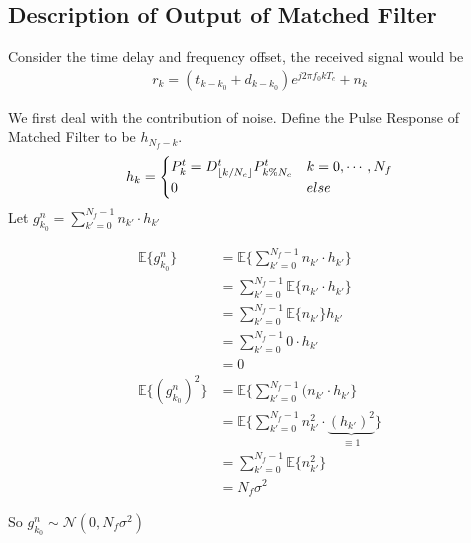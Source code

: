 \documentclass[a4paper]{article}
\begin{document}
\subsection{Description of Output of Matched Filter} %
\label{sub:description_of_output_of_matched_filter}
Consider the time delay and frequency offset, the received signal would be 
\begin{align}
	r_k = (t_{k - k_0} + d_{k - k_0}) e^{j 2\pi f_0 k T_c} + n_k
\end{align}

We first deal with the contribution of noise.
Define the Pulse Response of Matched Filter to be $h_{N_f-k}$.
\begin{align}
	h_k = 
	\begin{cases}
	P^t_{k} = D^t_{\lfloor k/N_c\rfloor}P^t_{k\%N_c} & k = 0, \cdots, N_f\\
	0 	& else	
	\end{cases}
\end{align}
Let $g^n_{k_0}= \sum_{k' = 0}^{N_f-1} n_{k'} \cdot h_{k'}$

\begin{align}
	\mathbb{E} \{ g^n_{k_0}\}
	&= \mathbb{E} \{\sum_{k' = 0}^{N_f-1} n_{k'} \cdot h_{k'}\} \\
	&= \sum_{k' = 0}^{N_f-1} \mathbb{E} \{ n_{k'} \cdot h_{k'} \} \\
	&= \sum_{k' = 0}^{N_f-1} \mathbb{E} \{ n_{k'}\} h_{k'} \\
	&= \sum_{k' = 0}^{N_f-1} 0 \cdot h_{k'} \\
	&= 0\\
	\mathbb{E} \{ (g^n_{k_0})^2\}
	&= \mathbb{E} \{\sum_{k' = 0}^{N_f-1} (n_{k'} \cdot h_{k'}\} \\
	&= \mathbb{E} \{\sum_{k' = 0}^{N_f-1} n_{k'}^2 \cdot \underbrace{(h_{k'})^2}_{\equiv1}\} \\
	&= \sum_{k' = 0}^{N_f-1} \mathbb{E} \{n_{k'}^2 \}\\
	&= N_f \sigma^2
\end{align}

So $g^n_{k_0}\sim \mathcal{N} (0, N_f \sigma^2)$
\end{document}
